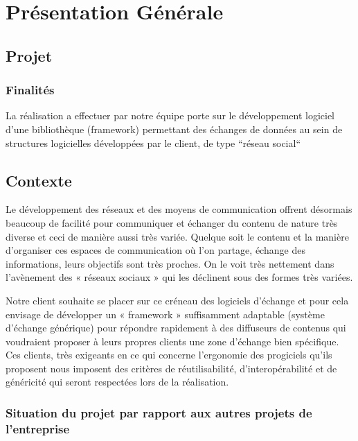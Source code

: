 \section{Présentation Générale}
\subsection{Projet}
\subsubsection{Finalités}

La réalisation a effectuer par notre équipe porte sur le développement logiciel d'une bibliothèque (framework) permettant des échanges de données au sein de structures logicielles développées par le client, de type ``réseau social`` 


\subsection{Contexte}

Le développement des réseaux et des moyens de communication offrent désormais beaucoup
de facilité pour communiquer et échanger du contenu de nature très diverse et ceci de manière aussi très variée. Quelque soit le contenu et la manière d’organiser ces espaces de communication où l’on partage, échange des informations, leurs objectifs sont très proches.
On le voit très nettement dans l’avènement des « réseaux sociaux » qui les déclinent sous des formes très variées.

Notre client souhaite se placer sur ce créneau des logiciels d’échange et pour cela
envisage de développer un « framework » suffisamment adaptable (système d’échange
générique) pour répondre rapidement à des diffuseurs de contenus qui voudraient proposer à leurs propres clients une zone d’échange bien spécifique. Ces clients, très exigeants en ce qui concerne l’ergonomie des progiciels qu’ils proposent nous imposent des critères de réutilisabilité, d'interopérabilité et de généricité qui seront respectées lors de la réalisation.

\subsubsection{Situation du projet par rapport aux autres projets de l’entreprise}

